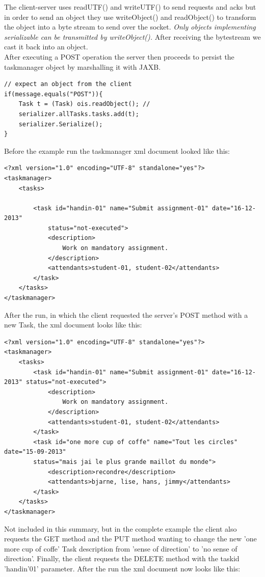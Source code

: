 The client-server uses readUTF() and writeUTF() to send requests and acks but in order to send an object they use writeObject() and readObject() to transform the object into a byte stream to send over the socket. \textit{Only objects implementing serializable can be transmitted by writeObject().} After receiving the bytestream we cast it back into an object.\\

After executing a POST operation the server then proceeds to persist the taskmanager object by marshalling it with JAXB.

\begin{lstlisting}[caption=server POST]
// expect an object from the client
if(message.equals("POST")){   
	Task t = (Task) ois.readObject(); // 
	serializer.allTasks.tasks.add(t);
    serializer.Serialize();	
}
\end{lstlisting}

Before the example run the taskmanager xml document looked like this:

\begin{lstlisting}[caption=xml before run]
<?xml version="1.0" encoding="UTF-8" standalone="yes"?>
<taskmanager>
	<tasks>
		
		<task id="handin-01" name="Submit assignment-01" date="16-12-2013"
			status="not-executed">
			<description>
				Work on mandatory assignment.
			</description>
			<attendants>student-01, student-02</attendants>
		</task>	
	</tasks>
</taskmanager>

\end{lstlisting}

After the run, in which the client requested the server's POST method with a new Task, the xml document looks like this:

\begin{lstlisting}[caption=xml after POST]
<?xml version="1.0" encoding="UTF-8" standalone="yes"?>
<taskmanager>
	<tasks>
		<task id="handin-01" name="Submit assignment-01" date="16-12-2013" status="not-executed">
			<description>
				Work on mandatory assignment.
			</description>
			<attendants>student-01, student-02</attendants>
		</task>
		<task id="one more cup of coffe" name="Tout les circles" date="15-09-2013" 
		status="mais jai le plus grande maillot du monde">
			<description>recondre</description>
			<attendants>bjarne, lise, hans, jimmy</attendants>
		</task>
	</tasks>
</taskmanager>
\end{lstlisting}

Not included in this summary, but in the complete example the client also requests the GET method and the PUT method wanting to change the new 'one more cup of coffe' Task description from 'sense of direction' to 'no sense of direction'. Finally, the client requests the DELETE method with the taskid 'handin'01' parameter. After the run the xml document now looks like this:

